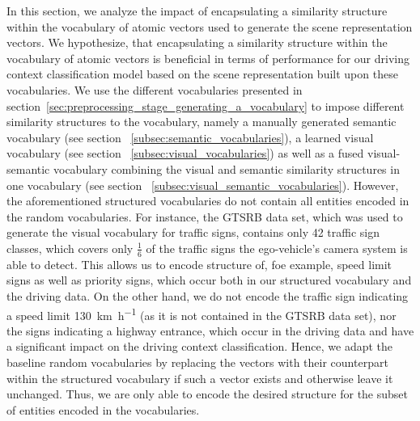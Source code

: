 In this section, we analyze the impact of encapsulating a similarity structure within the vocabulary of atomic vectors used to generate the scene representation vectors.
We hypothesize, that encapsulating a similarity structure within the vocabulary of atomic vectors is beneficial in terms of performance for our driving context classification model based on the scene representation built upon these vocabularies.
We use the different vocabularies presented in section~\ref{sec:preprocessing_stage_generating_a_vocabulary} to impose different similarity structures to the vocabulary, namely a manually generated semantic vocabulary (see section ~\ref{subsec:semantic_vocabularies}), a learned visual vocabulary (see section ~\ref{subsec:visual_vocabularies}) as well as a fused visual-semantic vocabulary combining the visual and semantic similarity structures in one vocabulary (see section
~\ref{subsec:visual_semantic_vocabularies}).
However, the aforementioned structured vocabularies do not contain all entities encoded in the random vocabularies.
For instance, the \ac{GTSRB} data set, which was used to generate the visual vocabulary for traffic signs, contains only \num{42} traffic sign classes, which covers only $\frac{1}{6}$ of the traffic signs the ego-vehicle's camera system is able to detect.
This allows us to encode structure of, foe example, speed limit signs as well as priority signs, which occur both in our structured vocabulary and the driving data.
On the other hand, we do not encode the traffic sign indicating a speed limit \SI[per-mode=symbol]{130}{\kilo\meter\per\hour} (as it is not contained in the \ac{GTSRB} data set), nor the signs indicating a highway entrance, which occur in the driving data and have a significant impact on the driving context classification.
Hence, we adapt the baseline random vocabularies by replacing the vectors with their counterpart within the structured vocabulary if such a vector exists and otherwise leave it unchanged.
Thus, we are only able to encode the desired structure for the subset of entities encoded in the vocabularies.

